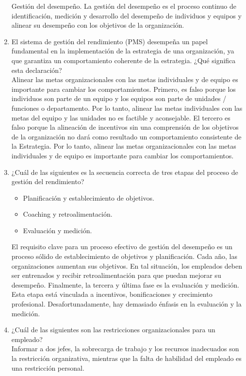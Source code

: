 \documentclass[10pt]{book}
\begin{document}
\begin{enumerate}[\bfseries 1.]
Gestión del desempeño. La gestión del desempeño es el proceso continuo de identificación, medición y desarrollo del desempeño de individuos y equipos y alinear su desempeño con los objetivos de la organización.
\item El sistema de gestión del rendimiento (PMS) desempeña un papel fundamental en la implementación de la estrategia de una organización, ya que garantiza un comportamiento coherente de la estrategia. ¿Qué significa esta declaración?\\
Alinear las metas organizacionales con las metas individuales y de equipo es importante para cambiar los comportamientos. Primero, es falso porque los individuos son parte de un equipo y los equipos son parte de unidades / funciones o departamento. Por lo tanto, alinear las metas individuales con las metas del equipo y las unidades no es factible y aconsejable. El tercero es falso porque la alineación de incentivos sin una comprensión de los objetivos de la organización no dará como resultado un comportamiento consistente de la Estrategia. Por lo tanto, alinear las metas organizacionales con las metas individuales y de equipo es importante para cambiar los comportamientos.
\item ¿Cuál de las siguientes es la secuencia correcta de tres etapas del proceso de gestión del rendimiento? 
\begin{itemize}
\item Planificación y establecimiento de objetivos.
\item Coaching y retroalimentación.
\item Evaluación y medición.
\end{itemize}
El requisito clave para un proceso efectivo de gestión del desempeño es un proceso sólido de establecimiento de objetivos y planificación. Cada año, las organizaciones aumentan sus objetivos. En tal situación, los empleados deben ser entrenados y recibir retroalimentación para que puedan mejorar su desempeño. Finalmente, la tercera y última fase es la evaluación y medición. Esta etapa está vinculada a incentivos, bonificaciones y crecimiento profesional. Desafortunadamente, hay demasiado énfasis en la evaluación y la medición.
\item ¿Cuál de las siguientes son las restricciones organizacionales para un empleado?\\
Informar a dos jefes, la sobrecarga de trabajo y los recursos inadecuados son la restricción organizativa, mientras que la falta de habilidad del empleado es una restricción personal.
\end{enumerate}
\end{document}
